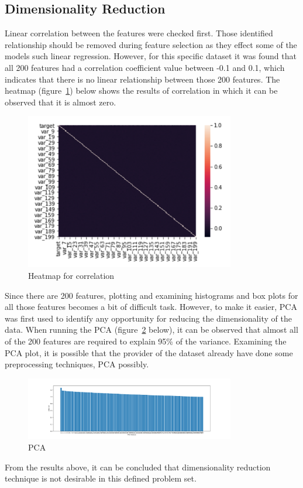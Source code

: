 \documentclass[journal,twoside,web]{ieeecolor}
\begin{document}
\subsection{Dimensionality Reduction}
Linear correlation between the features were checked first. Those identified relationship should be removed during feature selection as they effect some of the models such linear regression. However, for this specific dataset it was found that all 200 features had a correlation coefficient value between -0.1 and 0.1, which indicates that there is no linear relationship between those 200 features. The heatmap (figure~\ref{fig:fig1}) below shows the results of correlation in which it can be observed that it is almost zero. 
\begin{figure}[h!]
  \centering
  \includegraphics[width=3.6in]{project/code/heatmap.png}
  \caption{Heatmap for correlation}
  \label{fig:fig1}
\end{figure}

Since there are 200 features, plotting and examining histograms and box plots for all those features becomes a bit of difficult task. However, to make it easier, PCA was first used to identify any opportunity for reducing the dimensionality of the data. When running the PCA (figure~\ref{fig:fig2} below), it can be observed that almost all of the 200 features are required to explain 95\% of the variance. Examining the PCA plot, it is possible that the provider of the dataset already have done some preprocessing techniques, PCA possibly. 
\begin{figure}[h!]
  \centering
  \includegraphics[width=3.6in]{project/code/1-pcafeatures.png}
  \caption{PCA}
  \label{fig:fig2}
\end{figure}
From the results above, it can be concluded that dimensionality reduction technique is not desirable in this defined problem set.
\end{document}
